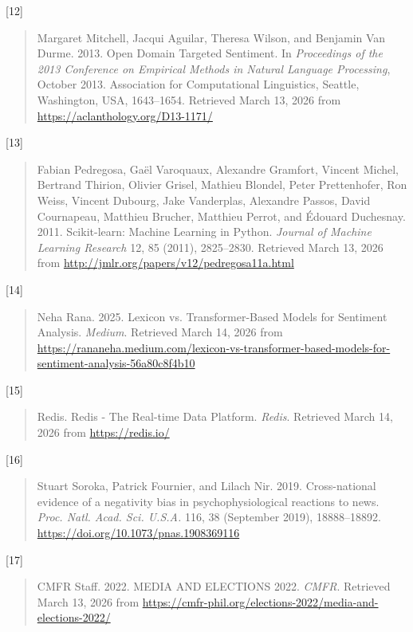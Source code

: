 {[}12{]}

\begin{quote}
Margaret Mitchell, Jacqui Aguilar, Theresa Wilson, and Benjamin Van Durme. 2013. Open Domain Targeted Sentiment. In \emph{Proceedings of the 2013 Conference on Empirical Methods in Natural Language Processing}, October 2013. Association for Computational Linguistics, Seattle, Washington, USA, 1643--1654. Retrieved March 13, 2026 from \url{https://aclanthology.org/D13-1171/}
\end{quote}

{[}13{]}

\begin{quote}
Fabian Pedregosa, Gaël Varoquaux, Alexandre Gramfort, Vincent Michel, Bertrand Thirion, Olivier Grisel, Mathieu Blondel, Peter Prettenhofer, Ron Weiss, Vincent Dubourg, Jake Vanderplas, Alexandre Passos, David Cournapeau, Matthieu Brucher, Matthieu Perrot, and Édouard Duchesnay. 2011. Scikit-learn: Machine Learning in Python. \emph{Journal of Machine Learning Research} 12, 85 (2011), 2825--2830. Retrieved March 13, 2026 from \url{http://jmlr.org/papers/v12/pedregosa11a.html}
\end{quote}

{[}14{]}

\begin{quote}
Neha Rana. 2025. Lexicon vs. Transformer-Based Models for Sentiment Analysis. \emph{Medium}. Retrieved March 14, 2026 from \url{https://rananeha.medium.com/lexicon-vs-transformer-based-models-for-sentiment-analysis-56a80c8f4b10}
\end{quote}

{[}15{]}

\begin{quote}
Redis. Redis - The Real-time Data Platform. \emph{Redis}. Retrieved March 14, 2026 from \url{https://redis.io/}
\end{quote}

{[}16{]}

\begin{quote}
Stuart Soroka, Patrick Fournier, and Lilach Nir. 2019. Cross-national evidence of a negativity bias in psychophysiological reactions to news. \emph{Proc. Natl. Acad. Sci. U.S.A.} 116, 38 (September 2019), 18888--18892. \url{https://doi.org/10.1073/pnas.1908369116}
\end{quote}

{[}17{]}

\begin{quote}
CMFR Staff. 2022. MEDIA AND ELECTIONS 2022. \emph{CMFR}. Retrieved March 13, 2026 from \url{https://cmfr-phil.org/elections-2022/media-and-elections-2022/}
\end{quote}

